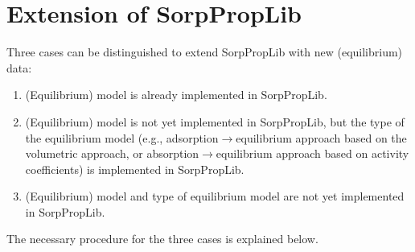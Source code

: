 \chapter{Extension of SorpPropLib}
\label{cha:extensions}
%
Three cases can be distinguished to extend SorpPropLib with new (equilibrium) data:
\begin{enumerate}
	\item (Equilibrium) model is already implemented in SorpPropLib.
	\item (Equilibrium) model is not yet implemented in SorpPropLib, but the type of the equilibrium model (e.g., adsorption$\rightarrow$equilibrium approach based on the volumetric approach, or absorption$\rightarrow$equilibrium approach based on activity coefficients) is implemented in SorpPropLib.
	\item (Equilibrium) model and type of equilibrium model are not yet implemented in SorpPropLib.
\end{enumerate}
The necessary procedure for the three cases is explained below.
